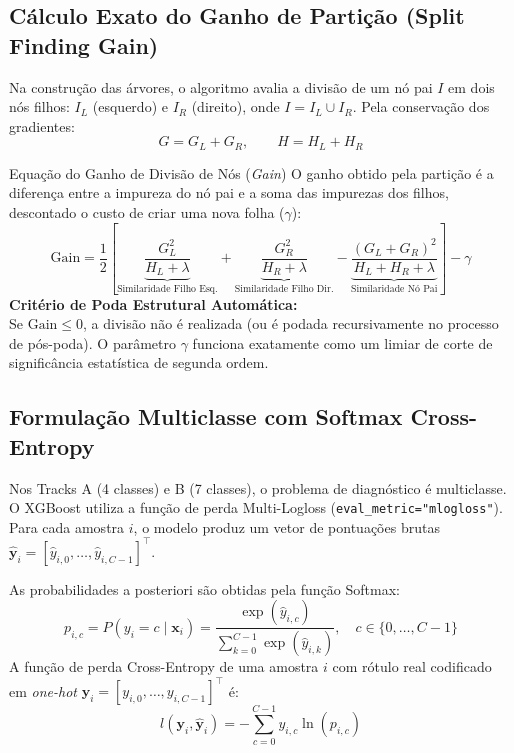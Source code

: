 \documentclass[11pt,a4paper]{article}
\begin{document}
\subsection{Cálculo Exato do Ganho de Partição (Split Finding Gain)}
Na construção das árvores, o algoritmo avalia a divisão de um nó pai $I$ em dois nós filhos: $I_L$ (esquerdo) e $I_R$ (direito), onde $I = I_L \cup I_R$. Pela conservação dos gradientes:
\begin{equation}
  G = G_L + G_R, \qquad H = H_L + H_R
\end{equation}

\begin{mathBox}{Equação do Ganho de Divisão de Nós (\textit{Gain})}
O ganho obtido pela partição é a diferença entre a impureza do nó pai e a soma das impurezas dos filhos, descontado o custo de criar uma nova folha ($\gamma$):
\begin{equation}
  \text{Gain} = \frac{1}{2} \left[ \underbrace{\frac{G_L^2}{H_L + \lambda}}_{\text{Similaridade Filho Esq.}} + \underbrace{\frac{G_R^2}{H_R + \lambda}}_{\text{Similaridade Filho Dir.}} - \underbrace{\frac{(G_L + G_R)^2}{H_L + H_R + \lambda}}_{\text{Similaridade Nó Pai}} \right] - \gamma
  \label{eq:xgb_gain}
\end{equation}
\textbf{Critério de Poda Estrutural Automática:}\\
Se $\text{Gain} \le 0$, a divisão não é realizada (ou é podada recursivamente no processo de pós-poda). O parâmetro $\gamma$ funciona exatamente como um limiar de corte de significância estatística de segunda ordem.
\end{mathBox}

\subsection{Formulação Multiclasse com Softmax Cross-Entropy}
Nos Tracks A (4 classes) e B (7 classes), o problema de diagnóstico é multiclasse. O XGBoost utiliza a função de perda Multi-Logloss (\texttt{eval\_metric="mlogloss"}). Para cada amostra $i$, o modelo produz um vetor de pontuações brutas $\hat{\mathbf{y}}_i = [\hat{y}_{i, 0}, \dots, \hat{y}_{i, C-1}]^\top$.

As probabilidades a posteriori são obtidas pela função Softmax:
\begin{equation}
  p_{i, c} = P(y_i = c \mid \mathbf{x}_i) = \frac{\exp(\hat{y}_{i, c})}{\sum_{k=0}^{C-1} \exp(\hat{y}_{i, k})}, \quad c \in \{0, \dots, C-1\}
  \label{eq:softmax}
\end{equation}
A função de perda Cross-Entropy de uma amostra $i$ com rótulo real codificado em \textit{one-hot} $\mathbf{y}_i = [y_{i, 0}, \dots, y_{i, C-1}]^\top$ é:
\begin{equation}
  l(\mathbf{y}_i, \hat{\mathbf{y}}_i) = -\sum_{c=0}^{C-1} y_{i, c} \ln(p_{i, c})
\end{equation}
\end{document}
